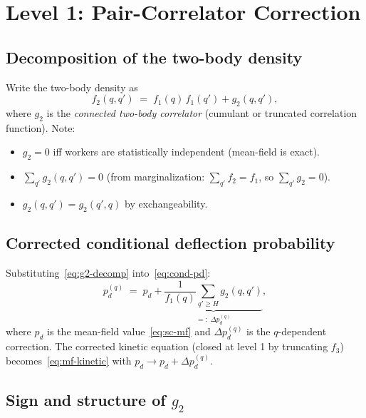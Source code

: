 \documentclass[11pt,a4paper]{report}
\newcommand{\pd}{p_d}
\newcommand{\fone}{f_1}
\newcommand{\ftwo}{f_2}
\newcommand{\gtwo}{g_2}
\begin{document}
\section{Level 1: Pair-Correlator Correction}

\subsection{Decomposition of the two-body density}

Write the two-body density as
\begin{equation}
  \ftwo(q, q') \;=\; \fone(q)\,\fone(q') + \gtwo(q, q'),
  \label{eq:g2-decomp}
\end{equation}
where $\gtwo$ is the \emph{connected two-body correlator}
(cumulant or truncated correlation function).
Note:
\begin{itemize}
  \item $\gtwo = 0$ iff workers are statistically independent
        (mean-field is exact).
  \item $\sum_{q'} \gtwo(q, q') = 0$ (from marginalization:
        $\sum_{q'} \ftwo = \fone$, so $\sum_{q'} \gtwo = 0$).
  \item $\gtwo(q, q') = \gtwo(q', q)$ by exchangeability.
\end{itemize}

\subsection{Corrected conditional deflection probability}

Substituting~\eqref{eq:g2-decomp} into~\eqref{eq:cond-pd}:
\begin{equation}
  \pd^{(q)}
  \;=\; \pd
  + \underbrace{
    \frac{1}{\fone(q)}\sum_{q' \geq H} \gtwo(q, q')
  }_{=:\; \Delta\pd^{(q)}},
  \label{eq:pd-corrected}
\end{equation}
where $\pd$ is the mean-field value~\eqref{eq:sc-mf} and
$\Delta\pd^{(q)}$ is the $q$-dependent correction.
The corrected kinetic equation (closed at level 1 by truncating $f_3$)
becomes~\eqref{eq:mf-kinetic} with $\pd \to \pd + \Delta\pd^{(q)}$.

\subsection{Sign and structure of $\gtwo$}
\end{document}
